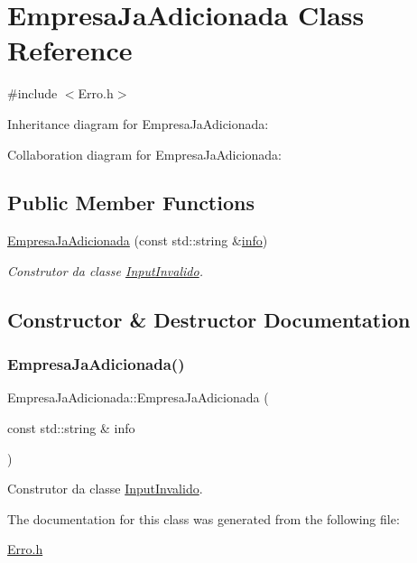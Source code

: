 \hypertarget{class_empresa_ja_adicionada}{}\section{Empresa\+Ja\+Adicionada Class Reference}
\label{class_empresa_ja_adicionada}


{\ttfamily \#include $<$Erro.\+h$>$}



Inheritance diagram for Empresa\+Ja\+Adicionada\+:


Collaboration diagram for Empresa\+Ja\+Adicionada\+:
\subsection*{Public Member Functions}
\begin{DoxyCompactItemize}
\item 
\mbox{\hyperlink{class_empresa_ja_adicionada_a31a58cd9fd890fc30edd073a560b1a6e}{Empresa\+Ja\+Adicionada}} (const std\+::string \&\mbox{\hyperlink{class_erro_a3ecaaf6f8e15a0830a648035b456cb62}{info}})
\begin{DoxyCompactList}\small\item\em Construtor da classe \mbox{\hyperlink{class_input_invalido}{Input\+Invalido}}. \end{DoxyCompactList}\end{DoxyCompactItemize}


\subsection{Constructor \& Destructor Documentation}
\mbox{\label{class_empresa_ja_adicionada_a31a58cd9fd890fc30edd073a560b1a6e}} 
\subsubsection{\texorpdfstring{Empresa\+Ja\+Adicionada()}{EmpresaJaAdicionada()}}
{\footnotesize\ttfamily Empresa\+Ja\+Adicionada\+::\+Empresa\+Ja\+Adicionada (\begin{DoxyParamCaption}\item[{const std\+::string \&}]{info }\end{DoxyParamCaption})\hspace{0.3cm}{\ttfamily [inline]}}



Construtor da classe \mbox{\hyperlink{class_input_invalido}{Input\+Invalido}}. 



The documentation for this class was generated from the following file\+:\begin{DoxyCompactItemize}
\item 
\mbox{\hyperlink{_erro_8h}{Erro.\+h}}\end{DoxyCompactItemize}
